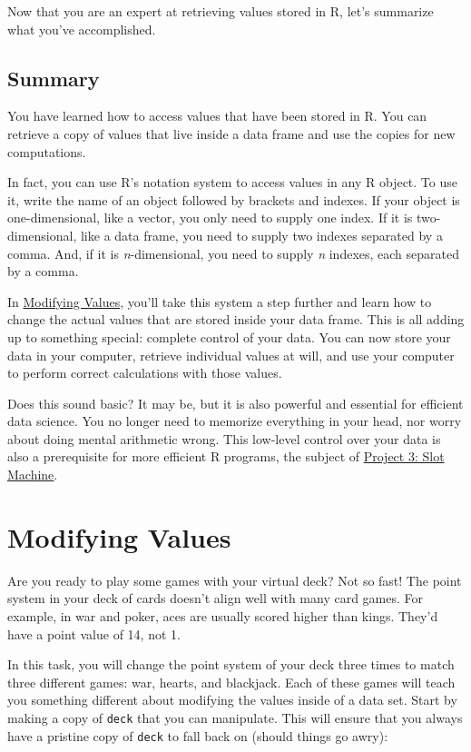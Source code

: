 \documentclass[
  letterpaper,
  DIV=11,
  numbers=noendperiod]{scrbook}
\begin{document}
Now that you are an expert at retrieving values stored in R, let's
summarize what you've accomplished.

\section{Summary}\label{summary-3}

You have learned how to access values that have been stored in R. You
can retrieve a copy of values that live inside a data frame and use the
copies for new computations.

In fact, you can use R's notation system to access values in any R
object. To use it, write the name of an object followed by brackets and
indexes. If your object is one-dimensional, like a vector, you only need
to supply one index. If it is two-dimensional, like a data frame, you
need to supply two indexes separated by a comma. And, if it is
\emph{n}-dimensional, you need to supply \emph{n} indexes, each
separated by a comma.

In \hyperref[sec-modifying-values]{Modifying Values}, you'll take this
system a step further and learn how to change the actual values that are
stored inside your data frame. This is all adding up to something
special: complete control of your data. You can now store your data in
your computer, retrieve individual values at will, and use your computer
to perform correct calculations with those values.

Does this sound basic? It may be, but it is also powerful and essential
for efficient data science. You no longer need to memorize everything in
your head, nor worry about doing mental arithmetic wrong. This low-level
control over your data is also a prerequisite for more efficient R
programs, the subject of \hyperref[sec-project-slots]{Project 3: Slot
Machine}.

\chapter{Modifying Values}\label{sec-modifying-values}

Are you ready to play some games with your virtual deck? Not so fast!
The point system in your deck of cards doesn't align well with many card
games. For example, in war and poker, aces are usually scored higher
than kings. They'd have a point value of 14, not 1.

In this task, you will change the point system of your deck three times
to match three different games: war, hearts, and blackjack. Each of
these games will teach you something different about modifying the
values inside of a data set. Start by making a copy of \texttt{deck}
that you can manipulate. This will ensure that you always have a
pristine copy of \texttt{deck} to fall back on (should things go awry):
\end{document}
